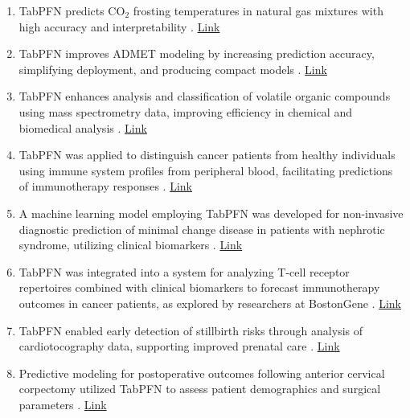 \begin{enumerate}
\item TabPFN predicts CO$_2$ frosting temperatures in natural gas mixtures with high accuracy and interpretability \cite{youcefi2026accurate}. \href{https://doi.org/10.1016/j.chemolab.2026.105679}{Link}

\item TabPFN improves ADMET modeling by increasing prediction accuracy, simplifying deployment, and producing compact models \cite{chupakhin2025descriptorfirst}. \href{https://doi.org/10.1021/acs.jcim.5c02094}{Link}

\item TabPFN enhances analysis and classification of volatile organic compounds using mass spectrometry data, improving efficiency in chemical and biomedical analysis \cite{granitto2025tabpfn}. \href{https://doi.org/10.1038/s41598-025-29128-6}{Link}

\item TabPFN was applied to distinguish cancer patients from healthy individuals using immune system profiles from peripheral blood, facilitating predictions of immunotherapy responses \cite{hc_usecase1_bostongene_tabpfn}. \href{https://www.linkedin.com/pulse/how-bostongene-utilized-tabpfn-identify-immune-system-profiles-vexle/}{Link}

\item A machine learning model employing TabPFN was developed for non-invasive diagnostic prediction of minimal change disease in patients with nephrotic syndrome, utilizing clinical biomarkers \cite{hc_usecase2_mcd_scirep}. \href{https://www.nature.com/articles/s41598-024-73898-4}{Link}

\item TabPFN was integrated into a system for analyzing T-cell receptor repertoires combined with clinical biomarkers to forecast immunotherapy outcomes in cancer patients, as explored by researchers at BostonGene \cite{hc_usecase3_immunotypes_cancercell}. \href{https://www.cell.com/cancer-cell/fulltext/S1535-6108(24)00132-6}{Link}

\item TabPFN enabled early detection of stillbirth risks through analysis of cardiotocography data, supporting improved prenatal care \cite{hc_usecase4_stillbirth_slas}. \href{https://www.sciencedirect.com/science/article/pii/S2472630324000852}{Link}

\item Predictive modeling for postoperative outcomes following anterior cervical corpectomy utilized TabPFN to assess patient demographics and surgical parameters \cite{hc_usecase5_acc_asj}. \href{https://pmc.ncbi.nlm.nih.gov/articles/PMC11366553/}{Link}


\end{enumerate}
